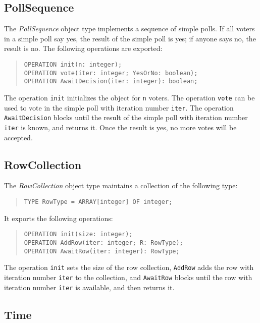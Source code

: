 \documentclass[10pt]{article}
\begin{document}
\subsection{PollSequence}

The {\em PollSequence} object type implements a sequence of simple polls.
If all voters in
a simple poll say yes, the result of the simple poll is yes; if anyone
says no, the result is no.
The following operations are exported:
\begin{quote}
\begin{verbatim}
OPERATION init(n: integer);
OPERATION vote(iter: integer; YesOrNo: boolean);
OPERATION AwaitDecision(iter: integer): boolean;
\end{verbatim}
\end{quote}
The operation \verb+init+ initializes the object for \verb+n+ voters.
The operation \verb+vote+ can be used to vote in the simple poll with
iteration number \verb+iter+.
The operation \verb+AwaitDecision+ blocks until the result of the
simple poll with iteration number \verb+iter+ is known, and returns it.
Once the result is yes, no more votes will be accepted.

\subsection{RowCollection}

The {\em RowCollection} object type maintains a collection of the following type:
\begin{quote}
\begin{verbatim}
TYPE RowType = ARRAY[integer] OF integer;
\end{verbatim}
\end{quote}
It exports the following operations:
\begin{quote}
\begin{verbatim}
OPERATION init(size: integer);
OPERATION AddRow(iter: integer; R: RowType);
OPERATION AwaitRow(iter: integer): RowType;
\end{verbatim}
\end{quote}
The operation \verb+init+ sets the size of the row collection, \verb+AddRow+
adds the row with iteration number \verb+iter+ to the collection,
and \verb+AwaitRow+ blocks until the row with iteration number
\verb+iter+ is available, and then returns it.


\subsection{Time}
\end{document}
